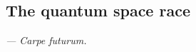 %
%

\subsection{The quantum space race}\label{sec:quant_space_race_essay}


\textit{--- Carpe futurum.}